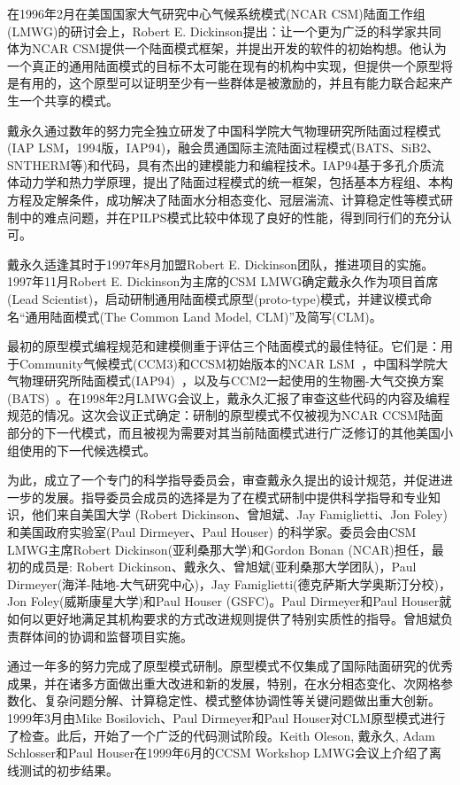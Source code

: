 在1996年2月在美国国家大气研究中心气候系统模式(NCAR CSM)陆面工作组(LMWG)的研讨会上，Robert E. Dickinson提出：让一个更为广泛的科学家共同体为NCAR CSM提供一个陆面模式框架，并提出开发的软件的初始构想。他认为一个真正的通用陆面模式的目标不太可能在现有的机构中实现，但提供一个原型将是有用的，这个原型可以证明至少有一些群体是被激励的，并且有能力联合起来产生一个共享的模式。

戴永久通过数年的努力完全独立研发了中国科学院大气物理研究所陆面过程模式(IAP LSM，1994版，IAP94)，融会贯通国际主流陆面过程模式(BATS、SiB2、SNTHERM等)和代码，具有杰出的建模能力和编程技术。IAP94基于多孔介质流体动力学和热力学原理，提出了陆面过程模式的统一框架，包括基本方程组、本构方程及定解条件，成功解决了陆面水分相态变化、冠层湍流、计算稳定性等模式研制中的难点问题，并在PILPS模式比较中体现了良好的性能，得到同行们的充分认可。

戴永久适逢其时于1997年8月加盟Robert E. Dickinson团队，推进项目的实施。1997年11月Robert E. Dickinson为主席的CSM LMWG确定戴永久作为项目首席(Lead Scientist)，启动研制通用陆面模式原型(proto-type)模式，并建议模式命名“通用陆面模式(The Common Land Model, CLM)”及简写(CLM)。

最初的原型模式编程规范和建模侧重于评估三个陆面模式的最佳特征。它们是：用于Community气候模式(CCM3)和CCSM初始版本的NCAR LSM~\citep{bonan1996land}，中国科学院大气物理研究所陆面模式(IAP94)~\citep{Dai-Zeng_97_IAP94}，以及与CCM2一起使用的生物圈-大气交换方案(BATS)~\citep{dickinson1993biosphere}。在1998年2月LMWG会议上，戴永久汇报了审查这些代码的内容及编程规范的情况。这次会议正式确定：研制的原型模式不仅被视为NCAR CCSM陆面部分的下一代模式，而且被视为需要对其当前陆面模式进行广泛修订的其他美国小组使用的下一代候选模式。

为此，成立了一个专门的科学指导委员会，审查戴永久提出的设计规范，并促进进一步的发展。指导委员会成员的选择是为了在模式研制中提供科学指导和专业知识，他们来自美国大学 (Robert Dickinson、曾旭斌、Jay Famiglietti、Jon Foley)和美国政府实验室(Paul Dirmeyer、Paul Houser) 的科学家。委员会由CSM LMWG主席Robert Dickinson(亚利桑那大学)和Gordon Bonan (NCAR)担任，最初的成员是: Robert Dickinson、戴永久、曾旭斌(亚利桑那大学团队)，Paul Dirmeyer(海洋-陆地-大气研究中心)，Jay Famiglietti(德克萨斯大学奥斯汀分校)，Jon Foley(威斯康星大学)和Paul Houser (GSFC)。Paul Dirmeyer和Paul Houser就如何以更好地满足其机构要求的方式改进规则提供了特别实质性的指导。曾旭斌负责群体间的协调和监督项目实施。

通过一年多的努力完成了原型模式研制。原型模式不仅集成了国际陆面研究的优秀成果，并在诸多方面做出重大改进和新的发展，特别，在水分相态变化、次网格参数化、复杂问题分解、计算稳定性、模式整体协调性等关键问题做出重大创新。1999年3月由Mike Bosilovich、Paul Dirmeyer和Paul Houser对CLM原型模式进行了检查。此后，开始了一个广泛的代码测试阶段。Keith Oleson, 戴永久, Adam Schlosser和Paul Houser在1999年6月的CCSM Workshop LMWG会议上介绍了离线测试的初步结果。

